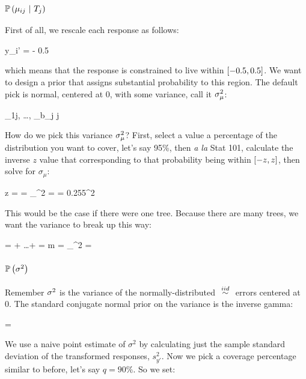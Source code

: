 \documentclass[12pt]{article}
\begin{document}
\subsubsection{$\mathbb{P}\left(\mu_{ij} ~|~ T_j\right)$}

First of all, we rescale each response as follows:

\beqn
y_i' =  - 0.5
\eeqn

which means that the response is constrained to live within $\left[-0.5,0.5\right]$. We want to design a prior that assigns substantial probability to this region. The default pick is normal, centered at 0, with some variance, call it $\sigma^2_\mu$:

\bneqn\label{eq:prior_for_leaf_values}
\mu_{1j}, \ldots, \mu_{b_j j} \iid {} \quad {}
\eneqn


How do we pick this variance $\sigma^2_\mu$? First, select a value a percentage of the distribution you want to cover, let's say 95\%, then \textit{a la} Stat 101, calculate the inverse $z$ value that corresponding to that probability being within $\left[-z,z\right]$, then solve for $\sigma_\mu$:

\beqn
z =   =  \mathimplies \sigma_\mu^2 =  = 0.255^2
\eeqn

This would be the case if there were one tree. Because there are many trees, we want the variance to break up this way:

\beqn
{} =  + \ldots +  = m\sigsqmu {} =  \mathimplies \sigma_\mu^2 = 
\eeqn

\subsubsection{$\mathbb{P}\left(\sigma^2\right)$}

Remember $\sigma^2$ is the variance of the normally-distributed $\iid$ errors centered at 0. The standard conjugate normal prior on the variance is the inverse gamma:

\beqn
\prob{\sigsq} = \invgammanot{\overtwo{\nu}}{\overtwo{\nu\lambda}}
\eeqn

We use a naive point estimate of $\sigma^2$ by calculating just the sample standard deviation of the transformed responses, $s_{y'}^2$. Now we pick a coverage percentage similar to before, let's say $q=90\%$. So we set:
\end{document}

